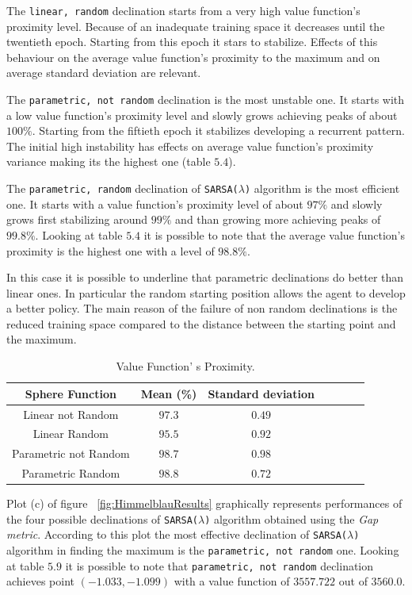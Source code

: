 The {\tt linear, random} declination starts from a very high value function's proximity level. Because of an inadequate training space it decreases until the twentieth epoch. Starting from this epoch it stars to stabilize. Effects of this behaviour on the average value function's proximity to the maximum and on average standard deviation are relevant.
 
The {\tt parametric, not random} declination is the most unstable one. It starts with a low value function's proximity level and slowly grows achieving peaks of about $100\%$. Starting from the fiftieth epoch it stabilizes developing a recurrent pattern. The initial high instability has effects on average value function's proximity variance making its the highest one (table $5.4$).
 
The {\tt parametric, random} declination of {\tt SARSA($\lambda$)} algorithm is the most efficient one. It starts with a value function's proximity level of about $97\%$ and slowly grows first stabilizing around $99\%$ and than growing more achieving peaks of $99.8\%$. Looking at table $5.4$ it is possible to note that the average value function's proximity is the highest one with a level of $98.8\%$.
 
In this case it is possible to underline that parametric declinations do better than linear ones. In particular the random starting position allows the agent to develop a better policy. The main reason of the failure of non random declinations is the reduced training space compared to the distance between the starting point and the maximum.

\begin{table}[h!]
	\centering
	\resizebox{\linewidth}{!} {
	\begin{tabular}{c| cccccc} 
		\hline \textbf{Sphere Function}
		& \textbf{Mean (\%)} & \textbf{Standard deviation} \\ 
		\hline Linear not Random
		& $97.3$ & \cellcolor{green!25}$0.49$ \\ 
		\hline Linear Random
		& $95.5$ & $0.92$ \\ 
		\hline Parametric not Random
		& $98.7$ & $0.98$ \\ 
		\hline Parametric Random
		& \cellcolor{green!25}$98.8$ & $0.72$ \\ 
		\hline 
	\end{tabular} 
}
\label{ParabolicTabProximity}
\caption{Value Function' s Proximity.} 
\end{table}

Plot (c) of figure ~\ref{fig:HimmelblauResults} graphically represents performances of the four possible declinations of {\tt SARSA($\lambda$)} algorithm obtained using the \textit{Gap metric}. According to this plot the most effective declination of {\tt SARSA($\lambda$)} algorithm in finding the maximum is the {\tt parametric, not random} one. Looking at table $5.9$ it is possible to note that {\tt parametric, not random} declination achieves point $(-1.033, -1.099)$ with a value function of $3557.722$ out of $3560.0$.

